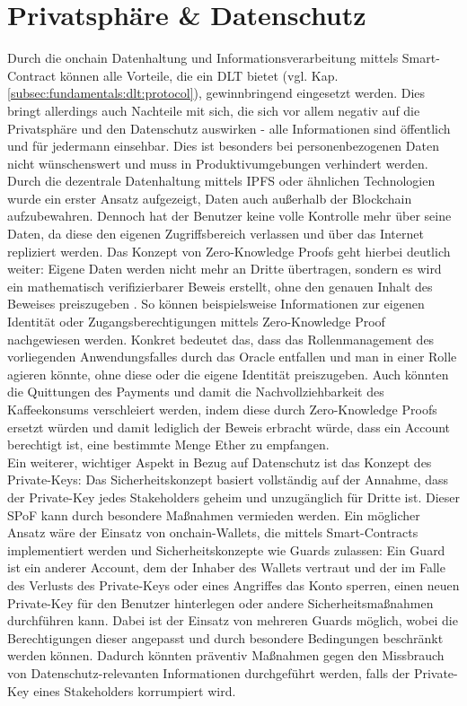 \section{Privatsphäre \& Datenschutz}
\label{sec:perspective:privacy}
Durch die onchain Datenhaltung und Informationsverarbeitung mittels Smart-Contract können alle Vorteile, die ein \ac{DLT} bietet (vgl. Kap. \ref{subsec:fundamentals:dlt:protocol}), gewinnbringend eingesetzt werden. Dies bringt allerdings auch Nachteile mit sich, die sich vor allem negativ auf die Privatsphäre und den Datenschutz auswirken - alle Informationen sind öffentlich und für jedermann einsehbar. Dies ist besonders bei personenbezogenen Daten nicht wünschenswert und muss in Produktivumgebungen verhindert werden. Durch die dezentrale Datenhaltung mittels \ac{IPFS} oder ähnlichen Technologien wurde ein erster Ansatz aufgezeigt, Daten auch außerhalb der Blockchain aufzubewahren. Dennoch hat der Benutzer keine volle Kontrolle mehr über seine Daten, da diese den eigenen Zugriffsbereich verlassen und über das Internet repliziert werden. Das Konzept von Zero-Knowledge Proofs geht hierbei deutlich weiter: Eigene Daten werden nicht mehr an Dritte übertragen, sondern es wird ein mathematisch verifizierbarer Beweis erstellt, ohne den genauen Inhalt des Beweises preiszugeben \cite{zeroknowledge2020}. So können beispielsweise Informationen zur eigenen Identität oder Zugangsberechtigungen mittels Zero-Knowledge Proof nachgewiesen werden. Konkret bedeutet das, dass das Rollenmanagement des vorliegenden Anwendungsfalles durch das Oracle entfallen und man in einer Rolle agieren könnte, ohne diese oder die eigene Identität preiszugeben. Auch könnten die Quittungen des Payments und damit die Nachvollziehbarkeit des Kaffeekonsums verschleiert werden, indem diese durch Zero-Knowledge Proofs ersetzt würden und damit lediglich der Beweis erbracht würde, dass ein Account berechtigt ist, eine bestimmte Menge Ether zu empfangen.\\
Ein weiterer, wichtiger Aspekt in Bezug auf Datenschutz ist das Konzept des Private-Keys: Das Sicherheitskonzept basiert vollständig auf der Annahme, dass der Private-Key jedes Stakeholders geheim und unzugänglich für Dritte ist. Dieser \ac{SPoF} kann durch besondere Maßnahmen vermieden werden. Ein möglicher Ansatz wäre der Einsatz von onchain-Wallets, die mittels Smart-Contracts implementiert werden und Sicherheitskonzepte wie Guards zulassen: Ein Guard ist ein anderer Account, dem der Inhaber des Wallets vertraut und der im Falle des Verlusts des Private-Keys oder eines Angriffes das Konto sperren, einen neuen Private-Key für den Benutzer hinterlegen oder andere Sicherheitsmaßnahmen durchführen kann. Dabei ist der Einsatz von mehreren Guards möglich, wobei die Berechtigungen dieser angepasst und durch besondere Bedingungen beschränkt werden können. Dadurch könnten präventiv Maßnahmen gegen den Missbrauch von Datenschutz-relevanten Informationen durchgeführt werden, falls der Private-Key eines Stakeholders korrumpiert wird.

